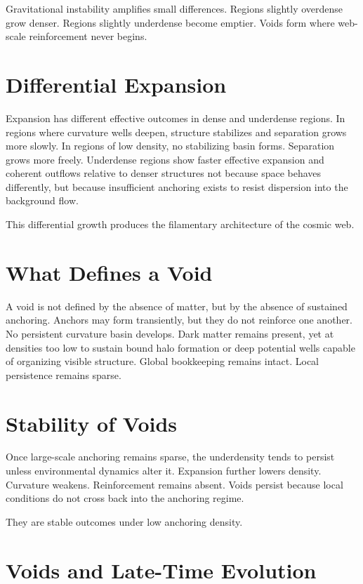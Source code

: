 \documentclass[11pt,twoside,openright]{book}
\begin{document}
Gravitational instability amplifies small differences. Regions slightly overdense grow denser. Regions slightly underdense become emptier. Voids form where web-scale reinforcement never begins.

\section*{Differential Expansion}

Expansion has different effective outcomes in dense and underdense regions. In regions where curvature wells deepen, structure stabilizes and separation grows more slowly. In regions of low density, no stabilizing basin forms. Separation grows more freely. Underdense regions show faster effective expansion and coherent outflows relative to denser structures not because space behaves differently, but because insufficient anchoring exists to resist dispersion into the background flow.

This differential growth produces the filamentary architecture of the cosmic web.

\section*{What Defines a Void}

A void is not defined by the absence of matter, but by the absence of sustained anchoring. Anchors may form transiently, but they do not reinforce one another. No persistent curvature basin develops. Dark matter remains present, yet at densities too low to sustain bound halo formation or deep potential wells capable of organizing visible structure. Global bookkeeping remains intact. Local persistence remains sparse.

\section*{Stability of Voids}

Once large-scale anchoring remains sparse, the underdensity tends to persist unless environmental dynamics alter it. Expansion further lowers density. Curvature weakens. Reinforcement remains absent. Voids persist because local conditions do not cross back into the anchoring regime.

They are stable outcomes under low anchoring density.

\section*{Voids and Late-Time Evolution}
\end{document}
